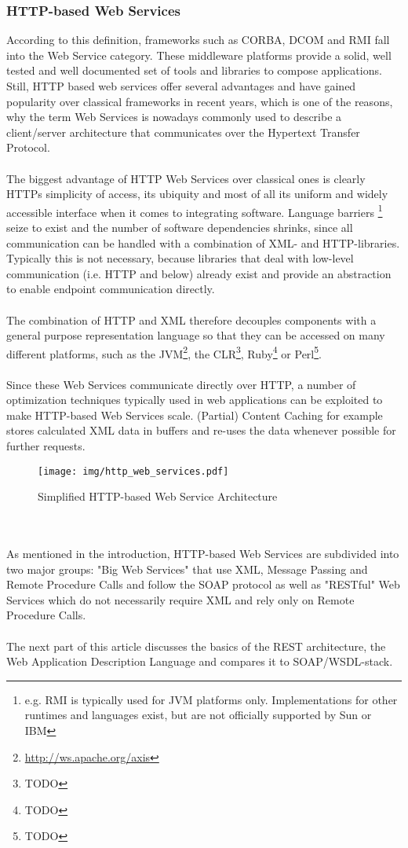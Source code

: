 \subsubsection*{HTTP-based Web Services}
According to this definition, frameworks such as CORBA, DCOM and RMI fall into the Web Service category. These middleware platforms provide a solid, well tested and well documented set of tools and libraries to compose applications. Still, HTTP based web services offer several advantages and have gained popularity over classical frameworks in recent years, which is one of the reasons, why the term Web Services is nowadays commonly used to describe a client/server architecture that communicates over the Hypertext Transfer Protocol.
\\ \\
The biggest advantage of HTTP Web Services over classical ones is clearly HTTPs simplicity of access, its ubiquity and most of all its uniform and widely accessible interface when it comes to integrating software. Language barriers \footnote{e.g. RMI is typically used for JVM platforms only. Implementations for other runtimes and languages exist, but are not officially supported by Sun or IBM} seize to exist and the number of software dependencies shrinks, since all communication can be handled with a combination of XML- and HTTP-libraries. Typically this is not necessary, because libraries that deal with low-level communication (i.e. HTTP and below) already exist and provide an abstraction to enable endpoint communication directly.
\\ \\
The combination of HTTP and XML therefore decouples components with a general purpose representation language so that they can be accessed on many different platforms, such as the JVM\footnote{\url{http://ws.apache.org/axis}}, the CLR\footnote{TODO}, Ruby\footnote{TODO} or Perl\footnote{TODO}. 
\\ \\
Since these Web Services communicate directly over HTTP, a number of optimization techniques typically used in web applications can be exploited to make HTTP-based Web Services scale. (Partial) Content Caching for example stores calculated XML data in buffers and re-uses the data whenever possible for further requests.
\begin{figure}[htp]
\centering
\texttt{[image: img/http\_web\_services.pdf]}
\caption{Simplified HTTP-based Web Service Architecture}\label{fig:erptsqfit}
\end{figure}
\\ \\
As mentioned in the introduction, HTTP-based Web Services are subdivided into two major groups: "Big Web Services" that use XML, Message Passing and Remote Procedure Calls and follow the SOAP protocol as well as "RESTful" Web Services which do not necessarily require XML and rely only on Remote Procedure Calls. 
\\ \\
The next part of this article discusses the basics of the REST architecture, the Web Application Description Language and compares it to SOAP/WSDL-stack.